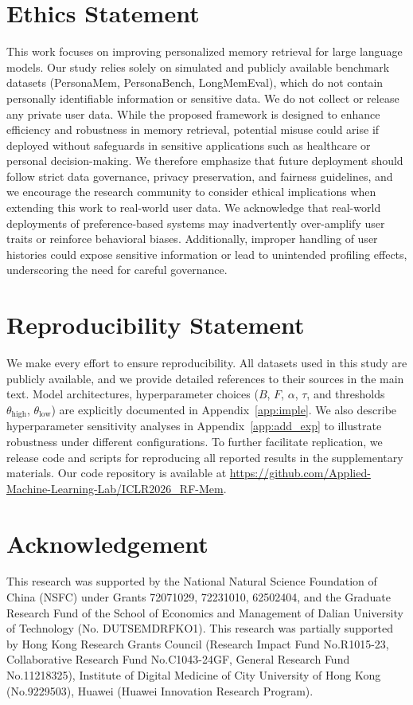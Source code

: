 \documentclass{article} %
\newcommand{\revise}[1]{{\color{black} #1}}
\begin{document}
\section*{Ethics Statement}
This work focuses on improving personalized memory retrieval for large language models. Our study relies solely on simulated and publicly available benchmark datasets (PersonaMem, PersonaBench, LongMemEval), which do not contain personally identifiable information or sensitive data. We do not collect or release any private user data. While the proposed framework is designed to enhance efficiency and robustness in memory retrieval, potential misuse could arise if deployed without safeguards in sensitive applications such as healthcare or personal decision-making. We therefore emphasize that future deployment should follow strict data governance, privacy preservation, and fairness guidelines, and we encourage the research community to consider ethical implications when extending this work to real-world user data. \revise{We acknowledge that real-world deployments of preference-based systems may inadvertently over-amplify user traits or reinforce behavioral biases. Additionally, improper handling of user histories could expose sensitive information or lead to unintended profiling effects, underscoring the need for careful governance.}

\section*{Reproducibility Statement}
\label{sec:Rreproduct}
We make every effort to ensure reproducibility. All datasets used in this study are publicly available, and we provide detailed references to their sources in the main text. Model architectures, hyperparameter choices ($B$, $F$, $\alpha$, $\tau$, and thresholds $\theta_{\text{high}}$, $\theta_{\text{low}}$) are explicitly documented in Appendix~\ref{app:imple}. We also describe hyperparameter sensitivity analyses in Appendix~\ref{app:add_exp} to illustrate robustness under different configurations. To further facilitate replication, we release code and scripts for reproducing all reported results in the supplementary materials. Our code repository is available at \url{https://github.com/Applied-Machine-Learning-Lab/ICLR2026_RF-Mem}.


\section*{Acknowledgement}
This research was supported by the National Natural Science Foundation of China (NSFC) under Grants 72071029, 72231010, 62502404, and the Graduate Research Fund of the School of Economics and Management of Dalian University of Technology (No. DUTSEMDRFKO1).  This research was partially supported by Hong Kong Research Grants Council (Research Impact Fund No.R1015-23, Collaborative Research Fund No.C1043-24GF, General Research Fund No.11218325), Institute of Digital Medicine of City University of Hong Kong (No.9229503), Huawei (Huawei Innovation Research Program).

\nocite{*}





\end{document}
